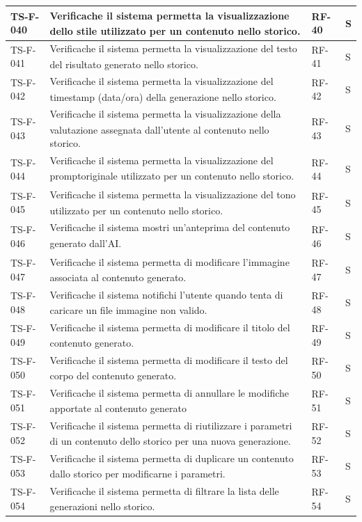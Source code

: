 \documentclass[a4paper,11pt]{article}
\renewcommand{\G}{\texorpdfstring{\textsubscript{\scalebox{0.6}{\textbf{G}}}\xspace}{ G}}
\begin{document}
\begin{longtable}{|p{2.2cm}|p{8.3cm}|p{2cm}|p{1.5cm}|}
TS-F-040 & Verifica\G che il sistema permetta la visualizzazione dello stile utilizzato
per un contenuto nello storico. & RF-40 & S \\ \hline
TS-F-041 & Verifica\G che il sistema permetta la visualizzazione del testo del
risultato generato nello storico. & RF-41 & S \\ \hline
TS-F-042 & Verifica\G che il sistema permetta la visualizzazione del timestamp
(data/ora) della generazione nello storico. & RF-42 & S \\ \hline
TS-F-043 & Verifica\G che il sistema permetta la visualizzazione della valutazione assegnata dall’utente al contenuto nello
storico. & RF-43 & S \\ \hline
TS-F-044 & Verifica\G che il sistema permetta la visualizzazione del prompt\G originale utilizzato per un contenuto nello
storico. & RF-44 & S \\ \hline
TS-F-045 & Verifica\G che il sistema permetta la visualizzazione del tono utilizzato
per un contenuto nello storico. & RF-45 & S \\ \hline
TS-F-046 & Verifica\G che il sistema mostri un’anteprima del
contenuto generato dall’AI\G. & RF-46 & S \\ \hline
TS-F-047 & Verifica\G che il sistema permetta di modificare
l’immagine associata al contenuto generato. & RF-47 & S \\ \hline
TS-F-048 & Verifica\G che il sistema notifichi l’utente quando tenta di caricare un file immagine non
valido. & RF-48 & S \\ \hline
TS-F-049 & Verifica\G che il sistema permetta di modificare il
titolo del contenuto generato. & RF-49 & S \\ \hline
TS-F-050 & Verifica\G che il sistema permetta di modificare il
testo del corpo del contenuto generato. & RF-50 & S \\ \hline
TS-F-051 & Verifica\G che il sistema permetta di annullare le
modifiche apportate al contenuto generato & RF-51 & S \\ \hline
TS-F-052 & Verifica\G che il sistema permetta di riutilizzare i
parametri di un contenuto dello storico per
una nuova generazione. & RF-52 & S \\ \hline
TS-F-053 & Verifica\G che il sistema permetta di duplicare un
contenuto dallo storico per modificarne i
parametri. & RF-53 & S \\ \hline
TS-F-054 & Verifica\G che il sistema permetta di filtrare la lista
delle generazioni nello storico. & RF-54 & S \\ \hline


\end{longtable}
\end{document}
